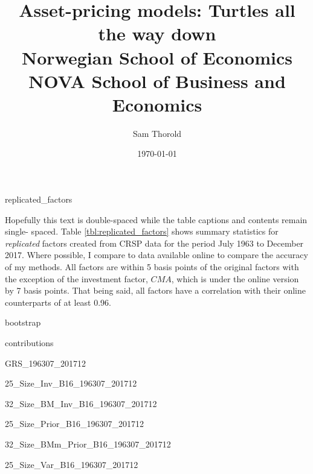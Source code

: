 \documentclass[a4paper, 12pt]{article}
\title{
  {Asset-pricing models: Turtles all the way down}\\
  {\large Norwegian School of Economics}\\
  {\large NOVA School of Business and Economics}
}
\author{Sam Thorold}
\date{\today}
\begin{document}
\maketitle

{replicated_factors}

Hopefully this text is double-spaced while the table captions and contents remain single-
spaced.
Table \ref{tbl:replicated_factors} shows summary statistics for \emph{replicated} factors
created from CRSP data for the period July 1963 to December 2017.
Where possible, I compare to data available online to compare the accuracy of my methods.
All factors are within 5 basis points of the original factors with the exception of the
investment factor, $CMA$, which is under the online version by 7 basis points.
That being said, all factors have a correlation with their online counterparts of at least
0.96.

\begin{landscape}
{bootstrap}
\end{landscape}

{contributions}

{GRS_196307_201712}

{25_Size_Inv_B16_196307_201712}

\begin{landscape}
{32_Size_BM_Inv_B16_196307_201712}

\end{landscape}

{25_Size_Prior_B16_196307_201712}

\begin{landscape}
{32_Size_BMm_Prior_B16_196307_201712}
\end{landscape}

{25_Size_Var_B16_196307_201712}
\end{document}
